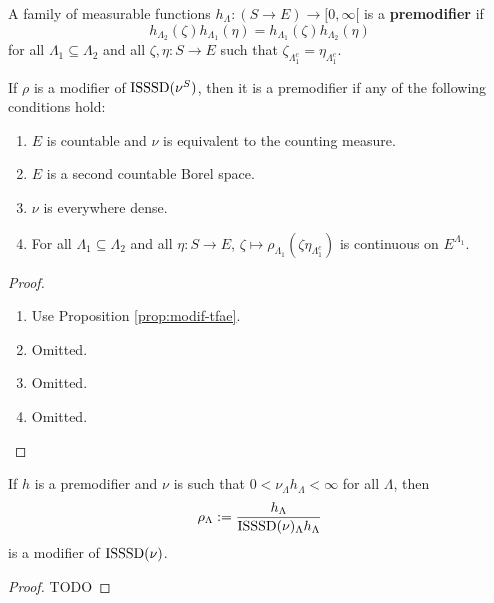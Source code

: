 
\begin{definition}[Premodifier]
    \label{def:premodif}
    \leanok

    A family of measurable functions $h_\Lambda : (S \to E) \to [0, \infty[$ is a {\bf premodifier} if
    $$h_{\Lambda_2}(\zeta)h_{\Lambda_1}(\eta) = h_{\Lambda_1}(\zeta)h_{\Lambda_2}(\eta)$$
    for all $\Lambda_1 \subseteq \Lambda_2$ and all $\zeta, \eta : S \to E$ such that $\zeta_{\Lambda_1^c} = \eta_{\Lambda_1^c}$.
\end{definition}

\begin{lemma}
    \label{lem:modif-premodif}
    If $\rho$ is a modifier of $\operatorname{ISSSD}(\nu^S)$, then it is a premodifier if any of the following conditions hold:
    \begin{enumerate}
        \item $E$ is countable and $\nu$ is equivalent to the counting measure.
        \item $E$ is a second countable Borel space.
        \item $\nu$ is everywhere dense.
        \item For all $\Lambda_1 \subseteq \Lambda_2$ and all $\eta : S \to E$, $\zeta \mapsto \rho_{\Lambda_1}(\zeta \eta_{\Lambda_1^c})$ is continuous on $E^{\Lambda_1}$.
    \end{enumerate}
\end{lemma}
\begin{proof}

    \begin{enumerate}
        \item Use Proposition \ref{prop:modif-tfae}.
        \item Omitted.
        \item Omitted.
        \item Omitted.
    \end{enumerate}
\end{proof}

\begin{lemma}
    \label{lem:premodif-modif}
    \leanok
    If $h$ is a premodifier and $\nu$ is such that $0 < \nu_\Lambda h_\Lambda < \infty$ for all $\Lambda$, then
    $$\rho_\Lambda := \frac{h_\Lambda}{\operatorname{ISSSD}(\nu)_\Lambda h_\Lambda}$$
    is a modifier of $\operatorname{ISSSD}(\nu)$.
\end{lemma}
\begin{proof}

    TODO
\end{proof}

